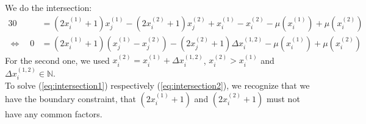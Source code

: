 We do the intersection:
\begin{alignat}{3}
	0 &= \left(2x_{i}^{\left(1\right)} + 1\right)x_{j}^{\left(1\right)} - \left(2x_{i}^{\left(2\right)} + 1\right)x_{j}^{\left(2\right)} + x_{i}^{\left(1\right)} - x_{i}^{\left(2\right)} - \mu\left(x_{i}^{\left(1\right)}\right) + \mu\left(x_{i}^{\left(2\right)}\right) \label{eq:intersection1} \\
	\Leftrightarrow \quad 0 &= \left(2x_{i}^{\left(1\right)} + 1\right)\left(x_{j}^{\left(1\right)} - x_{j}^{\left(2\right)}\right) - \left(2x_{j}^{\left(2\right)} + 1\right)\Delta x_{i}^{\left(1,2\right)} - \mu\left(x_{i}^{\left(1\right)}\right) + \mu\left(x_{i}^{\left(2\right)}\right) \label{eq:intersection2}
\end{alignat}
For the second one, we used $x_{i}^{\left(2\right)} = x_{i}^{\left(1\right)} + \Delta x_{i}^{\left(1,2\right)}$, $x_{i}^{\left(2\right)} > x_{i}^{\left(1\right)}$ and $\Delta x_{i}^{\left(1,2\right)} \in \mathbb{N}$.\\
To solve (\ref{eq:intersection1}) respectively (\ref{eq:intersection2}), we recognize that we have the boundary constraint, that $\left(2x_{i}^{\left(1\right)} + 1\right)$ and $\left(2x_{i}^{\left(2\right)} + 1\right)$ must not have any common factors.

